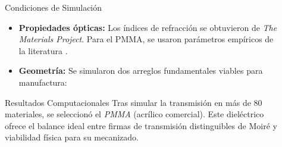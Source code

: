 \documentclass[final]{beamer}
\newlength{\sepwidth}
\newlength{\colwidth}
\newcommand{\separatorcolumn}{\begin{column}{\sepwidth}\end{column}}
\begin{document}
\begin{frame}[t]
\begin{columns}[t]
\begin{column}{\colwidth}
      \end{column}
      \separatorcolumn

      \begin{column}{\colwidth}

        \begin{block}{Condiciones de Simulación}
          \begin{itemize}
            \item \textbf{Propiedades ópticas:} Los índices de refracción se obtuvieron de \textit{The Materials Project}. Para el PMMA, se usaron parámetros empíricos de la literatura \cite{Tanwar2006}.
            \item \textbf{Geometría:} Se simularon dos arreglos fundamentales viables para manufactura:
          \end{itemize}

          \vspace{0.3em}
          \begin{center}
            \hspace{1.5cm}
          \end{center}
        \end{block}

        \begin{block}{Resultados Computacionales}
          Tras simular la transmisión en más de 80 materiales, se seleccionó el \textit{PMMA} (acrílico comercial). Este dieléctrico ofrece el balance ideal entre firmas de transmisión distinguibles de Moiré y viabilidad física para su mecanizado.


\end{block}
\end{column}
\end{columns}
\end{frame}
\end{document}

